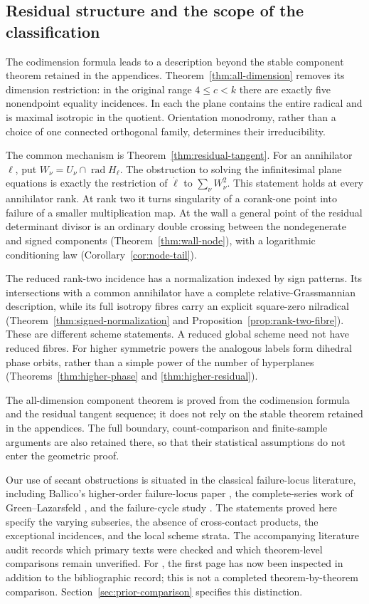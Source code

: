 \subsection*{Residual structure and the scope of the classification}
The codimension formula leads to a description beyond the stable
component theorem retained in the appendices. Theorem~\ref{thm:all-dimension}
removes its dimension restriction: in the original range $4\le c<k$
there are exactly five nonendpoint equality incidences. In each the
plane contains the entire radical and is maximal isotropic in the
quotient. Orientation monodromy, rather than a choice of one connected
orthogonal family, determines their irreducibility.

The common mechanism is Theorem~\ref{thm:residual-tangent}. For an
annihilator $\ell$, put $W_\nu=U_\nu\cap\operatorname{rad}H_\ell$.
The obstruction to solving the infinitesimal plane equations is exactly
the restriction of $\dot\ell$ to $\sum_\nu W_\nu^2$.
This statement holds at every annihilator rank. At rank two it turns
singularity of a corank-one point into failure of a smaller multiplication
map. At the wall a general point of the residual determinant divisor
is an ordinary double crossing between the nondegenerate and signed
components (Theorem~\ref{thm:wall-node}), with a logarithmic conditioning
law (Corollary~\ref{cor:node-tail}).

The reduced rank-two incidence has a normalization indexed by sign
patterns. Its intersections with a common annihilator have a complete
relative-Grassmannian description, while its full isotropy fibres carry
an explicit square-zero nilradical
(Theorem~\ref{thm:signed-normalization} and
Proposition~\ref{prop:rank-two-fibre}). These are different scheme
statements. A reduced global scheme need not have reduced fibres.
For higher symmetric powers the analogous labels form dihedral phase
orbits, rather than a simple power of the number of hyperplanes
(Theorems~\ref{thm:higher-phase} and \ref{thm:higher-residual}).

The all-dimension component theorem is proved from the codimension
formula and the residual tangent sequence; it does not rely on the
stable theorem retained in the appendices. The full boundary,
count-comparison and finite-sample arguments are also retained there,
so that their statistical assumptions do not enter the geometric proof.

Our use of secant obstructions is situated in the classical failure-locus
literature, including Ballico's higher-order failure-locus paper
\cite{Ballico93}, the complete-series work of Green--Lazarsfeld
\cite{GL86}, and the failure-cycle study \cite{Ballico96}.
The statements proved here specify the varying subseries, the absence
of cross-contact products, the exceptional incidences, and the local
scheme strata. The accompanying literature audit records which primary
texts were checked and which theorem-level comparisons remain
unverified. For \cite{Ballico93}, the first page has now been inspected in addition
to the bibliographic record; this is not a completed theorem-by-theorem
comparison. Section~\ref{sec:prior-comparison} specifies this distinction.


